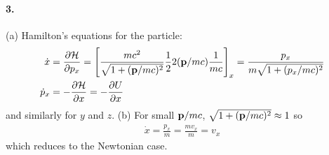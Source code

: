 \documentclass[../hw.tex]{subfiles}
\begin{document}
\newpage
\paragraph*{3.} (a) Hamilton's equations for the particle:
\begin{align*}
    \dot x &= \pdv{\ham}{p_x} = \qt[\frac{mc^2}{\sqrt{1 + (\vb p/mc)^2}}\frac{1}{2} 2(\vb p /mc) \frac{1}{mc}]_x
    = \frac{p_x}{m\sqrt{1 + (p_x/mc)^2}} \\
    \dot{p}_x &= -\pdv{\ham}{x} = -\pdv{U}{x}
\end{align*}
and similarly for $y$ and $z$. (b) For small $\vb p/mc$, $\sqrt{1 + (\vb p/mc)^2} \approx 1$ so
\begin{align*}
    \dot x = \frac{p_x}{m} = \frac{m v_x}{m} = v_x
\end{align*}
which reduces to the Newtonian case.
\end{document}
